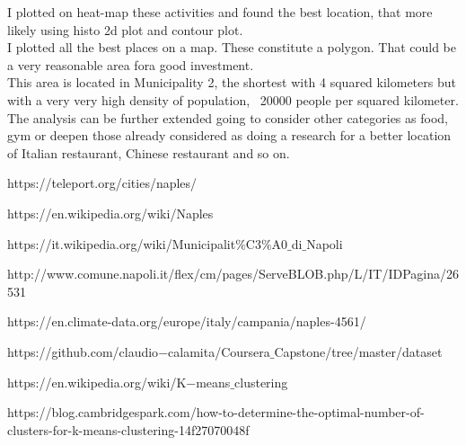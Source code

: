 \documentclass[a4paper, 12pt, oneside]{book}
\begin{document}
I plotted on heat-map these activities and found the best location, that more likely using histo 2d plot and contour plot. \\

I plotted all the best places on a map. These constitute a polygon. That could be a very reasonable area fora good investment. \\

This area is located in Municipality 2, the shortest with 4 squared kilometers but with a very very high density of population, ~20000 people per squared kilometer. \\

The analysis can be further extended going to consider other categories as food, gym or deepen those already considered as doing a research for a better location of Italian restaurant, Chinese restaurant and so on.

\begin{thebibliography}{9}
https://teleport.org/cities/naples/
 
https://en.wikipedia.org/wiki/Naples

https://it.wikipedia.org/wiki/Municipalit$\%$C3$\%$A0$\_$di$\_$Napoli

http://www.comune.napoli.it/flex/cm/pages/ServeBLOB.php/L/IT/IDPagina/26531 

https://en.climate-data.org/europe/italy/campania/naples-4561/

https://github.com/claudio$-$calamita/Coursera$\_$Capstone/tree/master/dataset

https://en.wikipedia.org/wiki/K$-$means$\_$clustering

https://blog.cambridgespark.com/how-to-determine-the-optimal-number-of-clusters-for-k-means-clustering-14f27070048f
\end{thebibliography}
\end{document}
